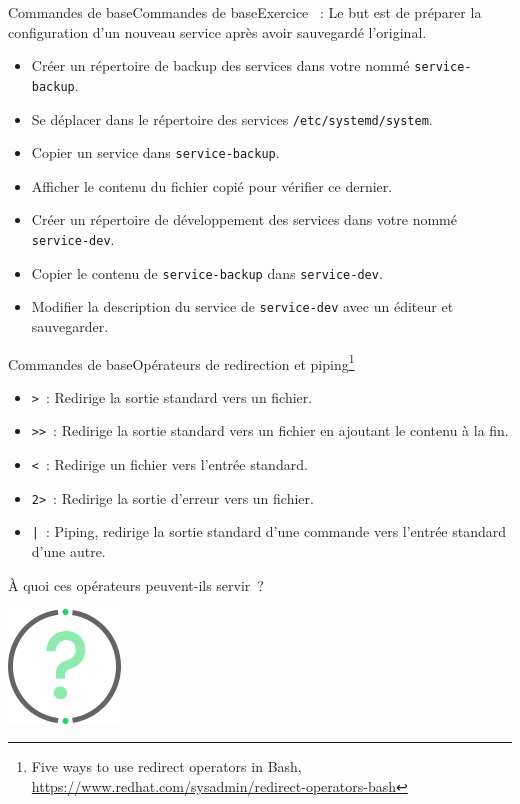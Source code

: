 \documentclass{beamer}
\begin{document}
    \begin{frame}{Commandes de base}{Commandes de base}{Exercice \execcounterdispinc{}~:}
        Le but est de préparer la configuration d'un nouveau service après avoir sauvegardé l'original.
        \begin{itemize}
            \item Créer un répertoire de backup des services dans votre  nommé \lstinline{service-backup}.
            \item Se déplacer dans le répertoire des services \lstinline{/etc/systemd/system}.
            \item Copier un service dans \lstinline{service-backup}.
            \item Afficher le contenu du fichier copié pour vérifier ce dernier.
            \item Créer un répertoire de développement des services dans votre  nommé \lstinline{service-dev}.
            \item Copier le contenu de \lstinline{service-backup} dans \lstinline{service-dev}.
            \item Modifier la description du service de \lstinline{service-dev} avec un éditeur et sauvegarder.
        \end{itemize}
    \end{frame}

    \begin{frame}{Commandes de base}{Opérateurs de redirection et piping\footnote{Five ways to use redirect operators in Bash, \url{https://www.redhat.com/sysadmin/redirect-operators-bash}}}
        \begin{footnotesize}
            \begin{itemize}
                \item \lstinline{>}~: Redirige la sortie standard vers un fichier.
                \item \lstinline{>>}~: Redirige la sortie standard vers un fichier en ajoutant le contenu à la fin.
                \item \lstinline{<}~: Redirige un fichier vers l'entrée standard.
                \item \lstinline{2>}~: Redirige la sortie d'erreur vers un fichier.
                \item \lstinline{|}~: Piping, redirige la sortie standard d'une commande vers l'entrée standard d'une autre.
            \end{itemize}
            À quoi ces opérateurs peuvent-ils servir~?
            \begin{center}
                \includegraphics[width=3cm]{image/question-mark}
            \end{center}
        \end{footnotesize}
    \end{frame}
\end{document}
